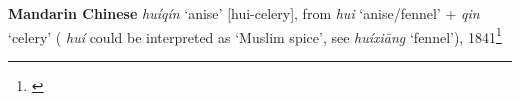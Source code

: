 \begin{etymology}\label{ety:huiqin}
\textbf{Mandarin Chinese}  \textit{huíqín} `anise' [hui-celery], from \textit{hui} `anise/fennel' + \textit{qin} `celery' ( \textit{huí} could be interpreted as `Muslim spice', see  \textit{huíxiāng} `fennel'), 1841\footnote{\textcite{kleeman_oxford_2010, hu_food_2005}}
\end{etymology}